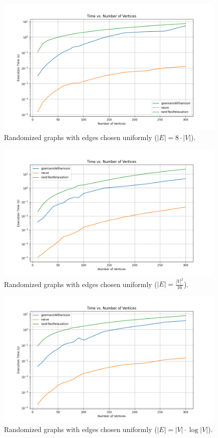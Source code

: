 \begin{figure}[H]
\centering
\includegraphics[width=\textwidth]{chapters/benchmark/Sections/images/cut/edges_times_8/time_vs_vertices.png}
\caption{ Randomized graphs with edges chosen uniformly (\(|E| = 8 \cdot |V|\)).}
\end{figure}

\begin{figure}[H]
\centering
\includegraphics[width=\textwidth]{chapters/benchmark/Sections/images/cut/edges_square_dev_16/time_vs_vertices.png}
\caption{ Randomized graphs with edges chosen uniformly (\(|E| = \frac{|V|^2}{16}\)).}
\end{figure}

\begin{figure}[H]
\centering
\includegraphics[width=\textwidth]{chapters/benchmark/Sections/images/cut/edges_v_times_log/time_vs_vertices.png}
\caption{ Randomized graphs with edges chosen uniformly (\(|E| = |V| \cdot \log{|V|}\)).}
\end{figure}

